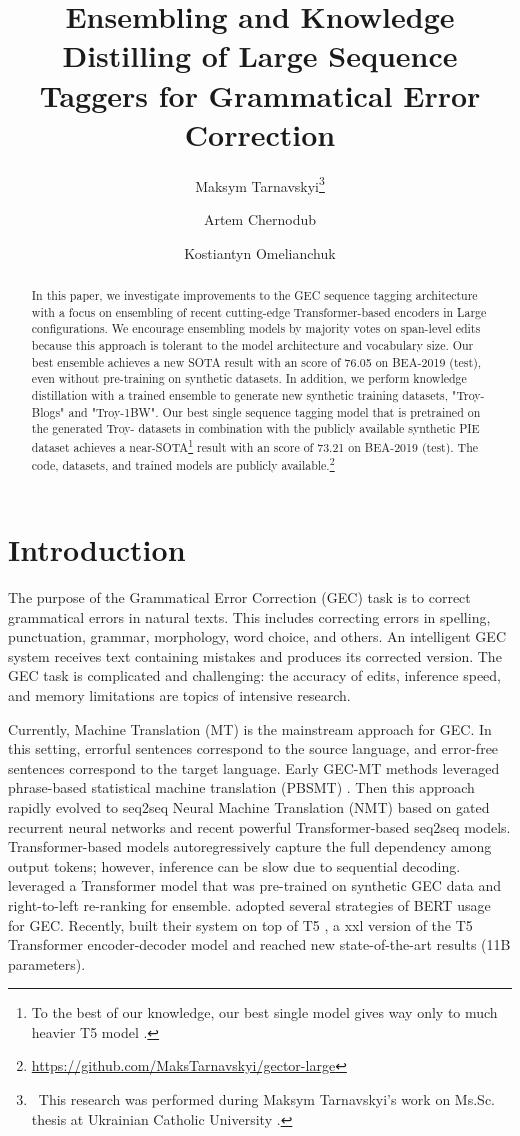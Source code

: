 \documentclass[11pt]{article}
\title{Ensembling and Knowledge Distilling of Large Sequence Taggers for Grammatical Error Correction}
\author{Maksym Tarnavskyi\thanks{\ This research was performed during Maksym Tarnavskyi's work on Ms.Sc. thesis at Ukrainian Catholic University \cite{tar2021}.}}
\author[]{Artem Chernodub}
\author[]{Kostiantyn Omelianchuk}
\affil[]{Ukrainian Catholic University, Faculty of Applied Sciences, \texttt{tarnavskyi@ucu.edu.ua}}
\affil[]{Grammarly, \texttt{firstname.lastname@grammarly.com}}
\begin{document}
\maketitle
\begin{abstract}
In this paper, we investigate improvements to the GEC sequence tagging architecture with a focus on ensembling of recent cutting-edge Transformer-based encoders in Large configurations. We encourage ensembling models by majority votes on span-level edits because this approach is tolerant to the model architecture and vocabulary size. Our best ensemble achieves a new SOTA result with an  score of 76.05 on BEA-2019 (test), even without pre-training on synthetic datasets. In addition, we perform knowledge distillation with a trained ensemble to generate new synthetic training datasets, "Troy-Blogs" and "Troy-1BW". Our best single sequence tagging model that is pretrained on the generated Troy- datasets in combination with the publicly available synthetic PIE dataset achieves a near-SOTA\footnote{To the best of our knowledge, our best single model gives way only to much heavier T5 model \cite{rothe2021a}.} result with an  score of 73.21 on BEA-2019 (test). The code, datasets, and trained models are publicly available.\footnote{\url{https://github.com/MaksTarnavskyi/gector-large}}
\end{abstract}

\section{Introduction}

The purpose of the Grammatical Error Correction (GEC) task is to correct grammatical errors in natural texts. This includes correcting errors in spelling, punctuation, grammar, morphology, word choice, and others. An intelligent GEC system receives text containing mistakes and produces its corrected version. The GEC task is complicated and challenging: the accuracy of edits, inference speed, and memory limitations are topics of intensive research.

Currently, Machine Translation (MT) is the mainstream approach for GEC. In this setting, errorful sentences correspond to the source language, and error-free sentences correspond to the target language. Early GEC-MT methods leveraged  phrase-based statistical machine translation (PBSMT) \cite{yuan-felice-2013-constrained}. Then this approach rapidly evolved to seq2seq Neural Machine Translation (NMT) based on gated recurrent neural networks \cite{yuan2016grammatical} and recent powerful Transformer-based seq2seq models. Transformer-based models autoregressively capture the full dependency among output tokens; however, inference can be slow due to sequential decoding. \citet{grundkiewicz-etal-2019-neural} leveraged a Transformer model  \cite{vaswani2017attention} that was pre-trained on synthetic GEC data and right-to-left re-ranking for ensemble. \citet{kaneko2020encoder} adopted several strategies of BERT \cite{devlin2018bert} usage for GEC. Recently, \citet{rothe2021a} built their system on top of T5 \cite{xue-etal-2021-mt5}, a xxl version of the T5 Transformer encoder-decoder model and reached new state-of-the-art results (11B parameters). 
\end{document}
